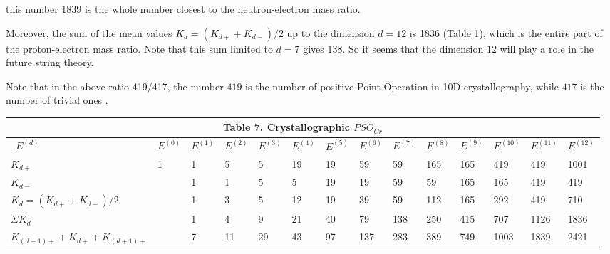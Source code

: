 \documentclass[a4paper,9pt]{article}
\begin{document}
    this number 1839 is the whole number closest to the neutron-electron mass ratio.


    
    Moreover, the sum of the mean values $K_{d} = (K_{d+} + K_{d-})/2$ up to the dimension $d = 12$ is 1836 (Table \ref{tab:7:table7}), which is the entire part of the proton-electron mass ratio. Note that this sum limited to $d = 7$ gives 138. So it seems that the dimension $12$ will play a role in the future string theory.
    
    
    Note that in the  above ratio 419/417, the number $419$ is the number of positive Point Operation in 10D crystallography, while $417$ is the number of trivial ones .

\begin{table}
\label{tab:7:table7}
  \hskip-1.0cm\begin{tabular}{llllllllllllll}
    \toprule
    \multicolumn{14}{c}{Table 7. Crystallographic $PSO_{Cr}$}                  \\
    \cmidrule(r){1-14}
    \midrule
    
     
     
      
      \ $E^{(d)}$ & $E^{(0)}$ & $E^{(1)} $ & $E^{(2)}$ & $E^{(3)} $& $E^{(4)}$ &$ E^{(5)}$ &$ E^{(6)} $&$ E^{(7)}$ &$ E^{(8)}$ & $E^{(9)}$ &$ E^{(10)} $&$ E^{(11)} $&$ E^{(12)}$ \\
    \midrule
    $K_{d+}$  & 1 & 1 & 5 & 5 & 19 & 19 & 59 & 59 & 165 & 165 & 419 & 419 & 1001 \\
    
     $K_{d-}$  &  & 1 & 1 & 5 & 5 & 19 & 19 & 59 & 59 & 165 & 165& 419 & 419 \\
     
      $K_{d} = (K_{d+} + K_{d-})/2$  & & 1 & 3 & 5 & 12 & 19 & 39 & 59 & 112 & 165 & 292 & 419 & 710 \\
      
      $\Sigma K_{d}$ &  & 1 & 4 & 9 & 21 & 40 & 79 & 138 & 250 & 415 & 707 & 1126 & 1836 \\
      
      $K_{(d-1)+} +K_{d+}+ K_{(d+1)+}$  &  & 7 & 11 & 29 & 43 & 97 & 137 & 283 & 389 & 749 & 1003 & 1839 & 2421 \\

      

    \bottomrule
  \end{tabular}
\end{table}
    
\end{document}
